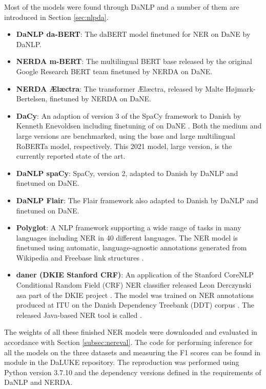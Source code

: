 \documentclass[main.tex]{subfiles}
\begin{document}
Most of the models were found through DaNLP \cite{danlp2021} and a number of them are introduced in Section \ref{sec:nlpda}.

\begin{itemize}
    \item \textbf{DaNLP da-BERT}: The daBERT model \cite{botxo2019dabert} finetuned for NER on DaNE by DaNLP.
    \item \textbf{NERDA m-BERT}: The multilingual BERT base released by the original Google Research BERT team \cite{devlin2019bert} finetuned by NERDA \cite{kjeldgaard2020nerda} on DaNE.
    \item \textbf{NERDA Ælæctra}: The transformer Ælæctra, released by Malte Højmark-Bertelsen, \cite{bertelsen2020lctra} finetuned by NERDA on DaNE.
    \item \textbf{DaCy}: An adaption of version 3 of the SpaCy framework \cite{honnibal2020spacy} to Danish by Kenneth Enevoldsen including finetuning of on DaNE \cite{enevoldsen2020dacy}.
        Both the medium and large versions are benchmarked, using the base and large multilingual RoBERTa model, respectively.
        This 2021 model, large version, is the currently reported state of the art.
    \item \textbf{DaNLP spaCy}: SpaCy, version 2, adapted to Danish by DaNLP and finetuned on DaNE.
    \item \textbf{DaNLP Flair}: The Flair framework \cite{akbik2019flair} also adapted to Danish by DaNLP and finetuned on DaNE.
    \item \textbf{Polyglot}: A NLP framework supporting a wide range of tasks in many languages including NER in 40 different languages.
        The NER model is finetuned using automatic, language-agnostic annotations generated from Wikipedia and Freebase link structures \cite{rfou2015polyglot}.
    \item \textbf{daner (DKIE Stanford CRF)}: An application of the Stanford CoreNLP Conditional Random Field (CRF) NER classifier \cite{manning2014corenlp} released Leon Derczynski asa part of the DKIE project \cite{derc2014dkie}.
    The model was trained on NER annotations produced at ITU on the Danish Dependency Treebank (DDT) corpus \cite{kromann2003ddt}.
    The released Java-based NER tool is called \footnotemark.
\end{itemize}
\noindent
The weights of all these finished NER models were downloaded and evaluated in accordance with Section \ref{subsec:nereval}.
The code for performing inference for all the models on the three datasets and measuring the F1 scores can be found in module  in the DaLUKE repository\footnotemark.
The reproduction was performed using Python version 3.7.10 and the dependency versions defined in the requirements of DaNLP and NERDA.
\end{document}
